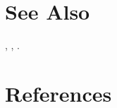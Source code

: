 
\section{See Also} %
\label{sec:mlsdeconv_see_also}
\texttt{}, \quad \texttt{}, \quad \texttt{}.


\section{References} %
\label{sec:mlsdeconv_references}



